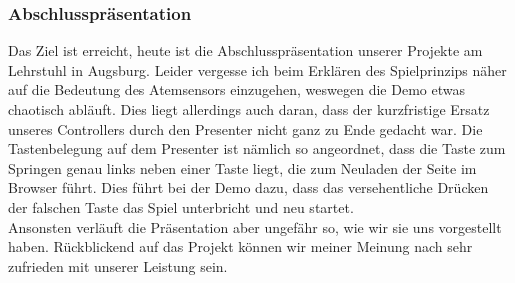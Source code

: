 \documentclass{report}
\begin{document}
\subsubsection{Abschlusspräsentation}

Das Ziel ist erreicht, heute ist die Abschlusspräsentation unserer Projekte am Lehrstuhl in Augsburg. Leider vergesse ich beim Erklären des Spielprinzips näher auf die Bedeutung des Atemsensors einzugehen, weswegen die Demo etwas chaotisch abläuft. Dies liegt allerdings auch daran, dass der kurzfristige Ersatz unseres Controllers durch den Presenter nicht ganz zu Ende gedacht war. Die Tastenbelegung auf dem Presenter ist nämlich so angeordnet, dass die Taste zum Springen genau links neben einer Taste liegt, die zum Neuladen der Seite im Browser führt. Dies führt bei der Demo dazu, dass das versehentliche Drücken der falschen Taste das Spiel unterbricht und neu startet. \\

\noindent Ansonsten verläuft die Präsentation aber ungefähr so, wie wir sie uns vorgestellt haben. Rückblickend auf das Projekt können wir meiner Meinung nach sehr zufrieden mit unserer Leistung sein.
\end{document}
